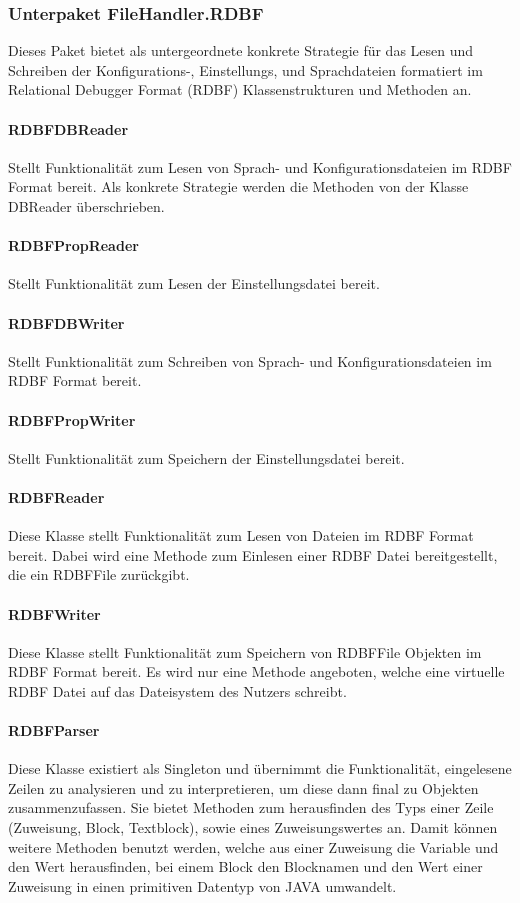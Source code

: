 \documentclass[parskip=full]{scrartcl}
\begin{document}
\subsubsection{Unterpaket FileHandler.RDBF}
Dieses Paket bietet als untergeordnete konkrete Strategie für das Lesen und Schreiben der Konfigurations-, Einstellungs, und Sprachdateien formatiert im Relational Debugger Format (RDBF) Klassenstrukturen und Methoden an.
\paragraph{RDBFDBReader}
Stellt Funktionalität zum Lesen von Sprach- und Konfigurationsdateien im RDBF Format bereit.
Als konkrete Strategie werden die Methoden von der Klasse DBReader überschrieben.
\paragraph{RDBFPropReader}
Stellt Funktionalität zum Lesen der Einstellungsdatei bereit.
\paragraph{RDBFDBWriter}
Stellt Funktionalität zum Schreiben von Sprach- und Konfigurationsdateien im RDBF Format bereit.
\paragraph{RDBFPropWriter}
Stellt Funktionalität zum Speichern der Einstellungsdatei bereit.

\paragraph{RDBFReader}
Diese Klasse stellt Funktionalität zum Lesen von Dateien im RDBF Format bereit.
Dabei wird eine Methode zum Einlesen einer RDBF Datei bereitgestellt, die ein RDBFFile zurückgibt.
\paragraph{RDBFWriter}
Diese Klasse stellt Funktionalität zum Speichern von RDBFFile Objekten im RDBF Format bereit.
Es wird nur eine Methode angeboten, welche eine virtuelle RDBF Datei auf das Dateisystem des Nutzers schreibt.
\paragraph{RDBFParser}
Diese Klasse existiert als Singleton und übernimmt die Funktionalität, eingelesene Zeilen zu analysieren und zu interpretieren, um diese dann final zu Objekten zusammenzufassen.
Sie bietet Methoden zum herausfinden des Typs einer Zeile (Zuweisung, Block, Textblock), sowie eines Zuweisungswertes an.
Damit können weitere Methoden benutzt werden, welche aus einer Zuweisung die Variable und den Wert herausfinden, bei einem Block den Blocknamen und den Wert einer Zuweisung in einen primitiven Datentyp von JAVA umwandelt.
\end{document}

